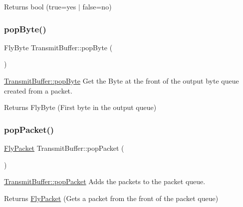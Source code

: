 \begin{DoxyReturn}{Returns}
bool (true=yes $\vert$ false=no) 
\end{DoxyReturn}
\hypertarget{class_transmit_buffer_a6da9417079dd783d996af8fcc138149c}{}\label{class_transmit_buffer_a6da9417079dd783d996af8fcc138149c} 
\subsubsection{\texorpdfstring{pop\+Byte()}{popByte()}}
{\footnotesize\ttfamily Fly\+Byte Transmit\+Buffer\+::pop\+Byte (\begin{DoxyParamCaption}{ }\end{DoxyParamCaption})}



\hyperlink{class_transmit_buffer_a6da9417079dd783d996af8fcc138149c}{Transmit\+Buffer\+::pop\+Byte} Get the Byte at the front of the output byte queue created from a packet. 

\begin{DoxyReturn}{Returns}
Fly\+Byte (First byte in the output queue) 
\end{DoxyReturn}
\hypertarget{class_transmit_buffer_add84c61a7f2f060d236feab584babc64}{}\label{class_transmit_buffer_add84c61a7f2f060d236feab584babc64} 
\subsubsection{\texorpdfstring{pop\+Packet()}{popPacket()}}
{\footnotesize\ttfamily \hyperlink{class_fly_packet}{Fly\+Packet} Transmit\+Buffer\+::pop\+Packet (\begin{DoxyParamCaption}{ }\end{DoxyParamCaption})}



\hyperlink{class_transmit_buffer_add84c61a7f2f060d236feab584babc64}{Transmit\+Buffer\+::pop\+Packet} Adds the packets to the packet queue. 

\begin{DoxyReturn}{Returns}
\hyperlink{class_fly_packet}{Fly\+Packet} (Gets a packet from the front of the packet queue) 
\end{DoxyReturn}
\hypertarget{class_transmit_buffer_aa7966064a6abaeb5ff3f7c8ff0402ec3}{}\label{class_transmit_buffer_aa7966064a6abaeb5ff3f7c8ff0402ec3} 
